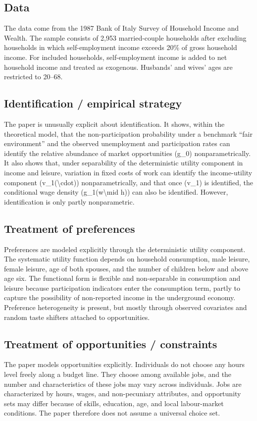 \documentclass[11pt,a4paper]{article}
\begin{document}
\subsection*{Data}
The data come from the 1987 Bank of Italy Survey of Household Income and Wealth. The sample consists of 2,953 married-couple households after excluding households in which self-employment income exceeds 20\% of gross household income. For included households, self-employment income is added to net household income and treated as exogenous. Husbands’ and wives’ ages are restricted to 20–68.

\subsection*{Identification / empirical strategy}
The paper is unusually explicit about identification. It shows, within the theoretical model, that the non-participation probability under a benchmark “fair environment” and the observed unemployment and participation rates can identify the relative abundance of market opportunities (g\_0) nonparametrically. It also shows that, under separability of the deterministic utility component in income and leisure, variation in fixed costs of work can identify the income-utility component (v\_1(\textbackslash{}cdot)) nonparametrically, and that once (v\_1) is identified, the conditional wage density (g\_1(w\textbackslash{}mid h)) can also be identified. However, identification is only partly nonparametric.

\subsection*{Treatment of preferences}
Preferences are modeled explicitly through the deterministic utility component. The systematic utility function depends on household consumption, male leisure, female leisure, age of both spouses, and the number of children below and above age six. The functional form is flexible and non-separable in consumption and leisure because participation indicators enter the consumption term, partly to capture the possibility of non-reported income in the underground economy. Preference heterogeneity is present, but mostly through observed covariates and random taste shifters attached to opportunities.

\subsection*{Treatment of opportunities / constraints}
The paper models opportunities explicitly. Individuals do not choose any hours level freely along a budget line. They choose among available jobs, and the number and characteristics of these jobs may vary across individuals. Jobs are characterized by hours, wages, and non-pecuniary attributes, and opportunity sets may differ because of skills, education, age, and local labour-market conditions. The paper therefore does not assume a universal choice set.
\end{document}
